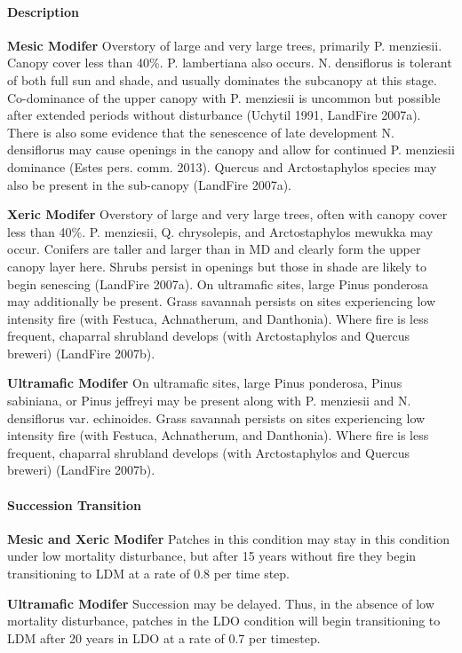 \paragraph{Description}
\begin{adjustwidth}{2cm}{}
\textbf{Mesic Modifer } Overstory of large and very large trees, primarily P. menziesii. Canopy cover less than 40\%. P. lambertiana also occurs. N. densiflorus is tolerant of both full sun and shade, and usually dominates the subcanopy at this stage. Co-dominance of the upper canopy with P. menziesii is uncommon but possible after extended periods without disturbance (Uchytil 1991, LandFire 2007a). There is also some evidence that the senescence of late development N. densiflorus may cause openings in the canopy and allow for continued P. menziesii dominance (Estes pers. comm. 2013). Quercus and Arctostaphylos species may also be present in the sub-canopy (LandFire 2007a).

\medskip
\noindent \textbf{Xeric Modifer}  Overstory of large and very large trees, often with canopy cover less than 40\%. P. menziesii, Q. chrysolepis, and Arctostaphylos mewukka may occur. Conifers are taller and larger than in MD and clearly form the upper canopy layer here. Shrubs persist in openings but those in shade are likely to begin senescing (LandFire 2007a). On ultramafic sites, large Pinus ponderosa may additionally be present. Grass savannah persists on sites experiencing low intensity fire (with Festuca, Achnatherum, and Danthonia). Where fire is less frequent, chaparral shrubland develops (with Arctostaphylos and Quercus breweri) (LandFire 2007b).

\medskip
\noindent \textbf{Ultramafic Modifer} On ultramafic sites, large Pinus ponderosa, Pinus sabiniana, or Pinus jeffreyi may be present along with P. menziesii and N. densiflorus var. echinoides. Grass savannah persists on sites experiencing low intensity fire (with Festuca, Achnatherum, and Danthonia). Where fire is less frequent, chaparral shrubland develops (with Arctostaphylos and Quercus breweri) (LandFire 2007b).

\end{adjustwidth}
\paragraph{Succession Transition}
\begin{adjustwidth}{2cm}{}
\textbf{Mesic and Xeric Modifer } Patches in this condition may stay in this condition under low mortality disturbance, but after 15 years without fire they begin transitioning to LDM at a rate of 0.8 per time step. 

\medskip
\noindent \textbf{Ultramafic Modifer} Succession may be delayed. Thus, in the absence of low mortality disturbance, patches in the LDO condition will begin transitioning to LDM after 20 years in LDO at a rate of 0.7 per timestep. 

\end{adjustwidth}
